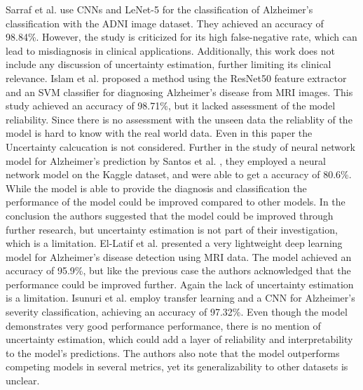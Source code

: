 \documentclass[12pt,onecolumn]{report}
\begin{document}
Sarraf et al. \cite{sarraf2016} use CNNs and LeNet-5 for the classification of Alzheimer’s classification with the ADNI image dataset. They achieved an accuracy of 98.84\%. However, the study is criticized for its high false-negative rate, which can lead to misdiagnosis in clinical applications. Additionally, this work does not include any discussion of uncertainty estimation, further limiting its clinical relevance. Islam et al. \cite{Islam2023} proposed a method using the ResNet50 feature extractor and an SVM classifier for diagnosing Alzheimer’s disease from MRI images. This study achieved an accuracy of 98.71\%, but it lacked assessment of the model reliability. Since there is no assessment with the unseen data the reliablity of the model is hard to know with the real world data. Even in this paper the Uncertainty calcucation is not considered. Further in the study of neural network model for Alzheimer’s prediction by Santos et al. \cite{Santos2023}, they employed a neural network model on  the Kaggle dataset, and were able to get a accuracy of 80.6\%. While the model is able to provide the diagnosis and classification the performance of the model could be improved compared to other models. In the conclusion the authors suggested that the model could be improved through further research, but uncertainty estimation is not part of their investigation, which is a limitation. El-Latif et al. \cite{Latif2023} presented a very lightweight deep learning model for Alzheimer’s disease detection using MRI data. The model achieved an accuracy of 95.9\%, but like the previous case the authors acknowledged that the performance could be improved further. Again the lack of uncertainty estimation is a limitation. Isunuri et al. \cite{Isunuri2023} employ transfer learning and a CNN for Alzheimer’s severity classification, achieving an accuracy of 97.32\%. Even though the model demonstrates very good performance performance, there is no mention of uncertainty estimation, which could add a layer of reliability and interpretability to the model’s predictions. The authors also note that the model outperforms competing models in several metrics, yet its generalizability to other datasets is unclear.
\end{document}
